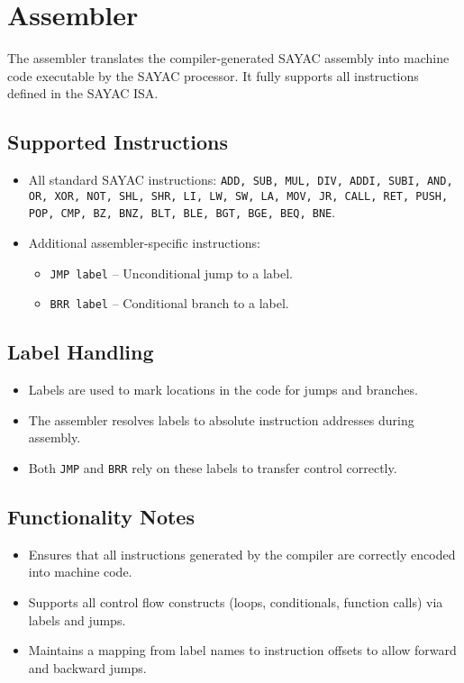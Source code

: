 \documentclass[12pt,a4paper]{report}
\begin{document}
\section{Assembler}
\label{sec:assembler}

The assembler translates the compiler-generated SAYAC assembly into machine code executable by the SAYAC processor.  
It fully supports all instructions defined in the SAYAC ISA.

\subsection{Supported Instructions}
\begin{itemize}
    \item All standard SAYAC instructions: \texttt{ADD, SUB, MUL, DIV, ADDI, SUBI, AND, OR, XOR, NOT, SHL, SHR, LI, LW, SW, LA, MOV, JR, CALL, RET, PUSH, POP, CMP, BZ, BNZ, BLT, BLE, BGT, BGE, BEQ, BNE}.
    \item Additional assembler-specific instructions:
    \begin{itemize}
        \item \texttt{JMP label} -- Unconditional jump to a label.
        \item \texttt{BRR label} -- Conditional branch to a label.
    \end{itemize}
\end{itemize}

\subsection{Label Handling}
\begin{itemize}
    \item Labels are used to mark locations in the code for jumps and branches.  
    \item The assembler resolves labels to absolute instruction addresses during assembly.  
    \item Both \texttt{JMP} and \texttt{BRR} rely on these labels to transfer control correctly.
\end{itemize}

\subsection{Functionality Notes}
\begin{itemize}
    \item Ensures that all instructions generated by the compiler are correctly encoded into machine code.  
    \item Supports all control flow constructs (loops, conditionals, function calls) via labels and jumps.  
    \item Maintains a mapping from label names to instruction offsets to allow forward and backward jumps.
\end{itemize}
\end{document}
